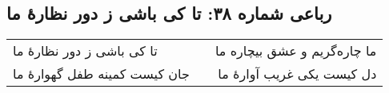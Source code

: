 \begin{center}
\section*{رباعی شماره ۳۸: تا کی باشی ز دور نظارهٔ ما}
\label{sec:0038}
\begin{longtable}{l p{0.5cm} r}
تا کی باشی ز دور نظارهٔ ما
&&
ما چاره‌گریم و عشق بیچاره ما
\\
جان کیست کمینه طفل گهوارهٔ ما
&&
دل کیست یکی غریب آوارهٔ ما
\\
\end{longtable}
\end{center}
